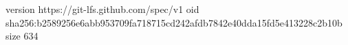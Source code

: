 version https://git-lfs.github.com/spec/v1
oid sha256:b2589256e6abb953709fa718715cd242afdb7842e40dda15fd5e413228c2b10b
size 634
